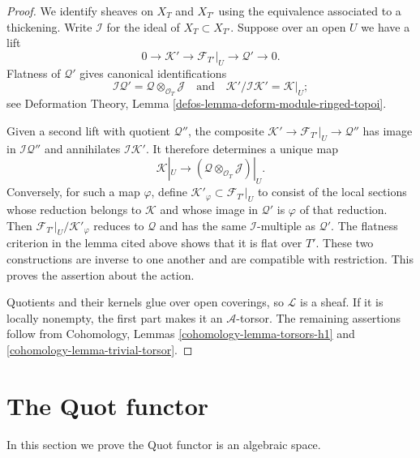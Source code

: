 \begin{proof}
We identify sheaves on $X_T$ and $X_{T'}$ using the equivalence associated
to a thickening. Write $\mathcal{I}$ for the ideal of
$X_T \subset X_{T'}$. Suppose over an open $U$ we have a lift
$$
0 \to \mathcal{K}' \to \mathcal{F}_{T'}|_U
\to \mathcal{Q}' \to 0.
$$
Flatness of $\mathcal{Q}'$ gives canonical identifications
$$
\mathcal{I}\mathcal{Q}' =
\mathcal{Q} \otimes_{\mathcal{O}_T} \mathcal{J}
\quad\text{and}\quad
\mathcal{K}'/\mathcal{I}\mathcal{K}' = \mathcal{K}|_U;
$$
see Deformation Theory, Lemma
\ref{defos-lemma-deform-module-ringed-topoi}.

Given a second lift with quotient $\mathcal{Q}''$, the composite
$\mathcal{K}' \to \mathcal{F}_{T'}|_U \to \mathcal{Q}''$ has image in
$\mathcal{I}\mathcal{Q}''$ and annihilates
$\mathcal{I}\mathcal{K}'$. It therefore determines a unique map
$$
\mathcal{K}|_U \longrightarrow
(\mathcal{Q} \otimes_{\mathcal{O}_T}\mathcal{J})|_U.
$$
Conversely, for such a map $\varphi$, define
$\mathcal{K}'_\varphi \subset \mathcal{F}_{T'}|_U$ to consist of the
local sections whose reduction belongs to $\mathcal{K}$ and whose image
in $\mathcal{Q}'$ is $\varphi$ of that reduction. Then
$\mathcal{F}_{T'}|_U/\mathcal{K}'_\varphi$ reduces to $\mathcal{Q}$ and
has the same $\mathcal{I}$-multiple as $\mathcal{Q}'$.
The flatness criterion in the lemma cited above shows that it is flat over
$T'$. These two constructions are inverse to one another and are compatible
with restriction. This proves the assertion about the action.

Quotients and their kernels glue over open coverings, so $\mathcal{L}$ is a
sheaf. If it is locally nonempty, the first part makes it an
$\mathcal{A}$-torsor. The remaining assertions follow from Cohomology,
Lemmas \ref{cohomology-lemma-torsors-h1} and
\ref{cohomology-lemma-trivial-torsor}.
\end{proof}










\section{The Quot functor}
\label{section-quot}

\noindent
In this section we prove the Quot functor is an algebraic space.

